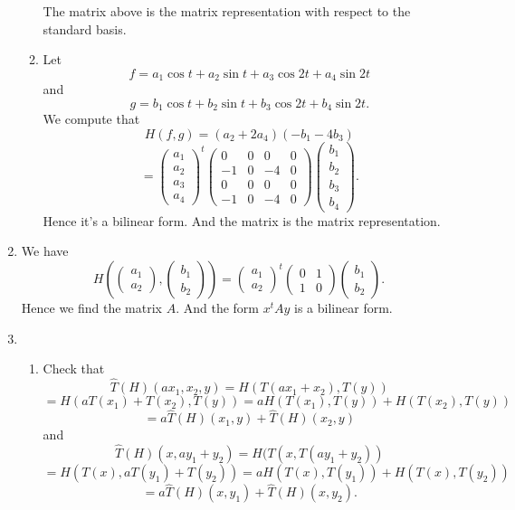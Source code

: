 \begin{enumerate}
\begin{enumerate}
The matrix above is the matrix representation with respect to the standard basis.
\item Let 
\[f=a_1\cos t+a_2\sin t +a_3\cos 2t+a_4\sin 2t\]
and 
\[g=b_1\cos t+b_2\sin t +b_3\cos 2t+b_4\sin 2t.\]
We compute that 
\[H(f,g)=(a_2+2a_4)(-b_1-4b_3)\]
\[=\begin{pmatrix}a_1\\a_2\\a_3\\a_4\end{pmatrix}^t\begin{pmatrix}0&0&0&0\\-1&0&-4&0\\0&0&0&0\\-1&0&-4&0\end{pmatrix}\begin{pmatrix}b_1\\b_2\\b_3\\b_4\end{pmatrix}.\]
Hence it's a bilinear form. And the matrix is the matrix representation.
\end{enumerate}
\item We have 
\[H\left(\begin{pmatrix}a_1\\a_2\end{pmatrix},\begin{pmatrix}b_1\\b_2\end{pmatrix}\right)=\begin{pmatrix}a_1\\a_2\end{pmatrix}^t\begin{pmatrix}0&1\\1&0\end{pmatrix}\begin{pmatrix}b_1\\b_2\end{pmatrix}.\]
Hence we find the matrix $A$. And the form $x^tAy$ is a bilinear form.
\item \begin{enumerate}
\item Check that 
\[\widehat{T}(H)(ax_1,x_2,y)=H(T(ax_1+x_2),T(y))\]
\[=H(aT(x_1)+T(x_2),T(y))=aH(T(x_1),T(y))+H(T(x_2),T(y))\]
\[=a\widehat{T}(H)(x_1,y)+\widehat{T}(H)(x_2,y)\]
and 
\[\widehat{T}(H)(x,ay_1+y_2)=H(T(x,T(ay_1+y_2))\]
\[=H(T(x),aT(y_1)+T(y_2))=aH(T(x),T(y_1))+H(T(x),T(y_2))\]
\[=a\widehat{T}(H)(x,y_1)+\widehat{T}(H)(x,y_2).\]

\end{enumerate}
\end{enumerate}
